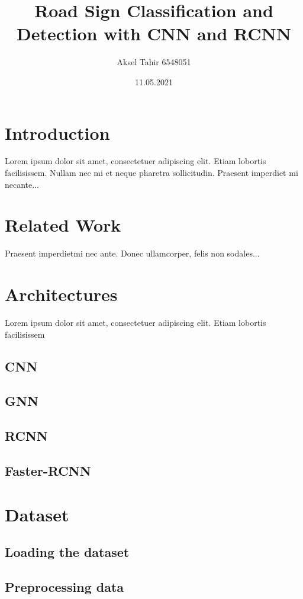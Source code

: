 \documentclass[12pt]{article}
\title{Road Sign Classification and Detection with CNN and RCNN}
\author{Aksel Tahir 6548051}
\date{11.05.2021}
\begin{document}
\maketitle

\tableofcontents

\section{Introduction}

Lorem ipsum dolor sit amet, consectetuer adipiscing elit.  
Etiam lobortis facilisissem.  Nullam nec mi et neque pharetra 
sollicitudin.  Praesent imperdiet mi necante...

\section{Related Work}
Praesent imperdietmi nec ante. Donec ullamcorper, felis non sodales...

\section{Architectures}
Lorem ipsum dolor sit amet, consectetuer adipiscing elit.  
Etiam lobortis facilisissem

\subsection{CNN}
\subsection{GNN}
\subsection{RCNN}
\subsection{Faster-RCNN}
    
\section{Dataset}
\subsection{Loading the dataset}
\subsection{Preprocessing data}
\end{document}
